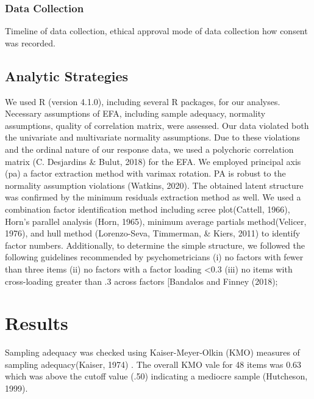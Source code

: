 \documentclass[
  english,
  man]{apa6}
\begin{document}
\hypertarget{data-collection}{%
\subsubsection{Data Collection}\label{data-collection}}

Timeline of data collection,
ethical approval
mode of data collection
how consent was recorded.

\hypertarget{analytic-strategies}{%
\subsection{Analytic Strategies}\label{analytic-strategies}}

We used R (version 4.1.0), including several R packages, for our analyses. Necessary assumptions of EFA, including sample adequacy, normality assumptions, quality of correlation matrix, were assessed. Our data violated both the univariate and multivariate normality assumptions. Due to these violations and the ordinal nature of our response data, we used a polychoric correlation matrix (C. Desjardins \& Bulut, 2018) for the EFA. We employed principal axis (pa) a factor extraction method with varimax rotation. PA is robust to the normality assumption violations (Watkins, 2020). The obtained latent structure was confirmed by the minimum residuals extraction method as well. We used a combination factor identification method including scree plot(Cattell, 1966), Horn's parallel analysis (Horn, 1965), minimum average partials method(Velicer, 1976), and hull method (Lorenzo-Seva, Timmerman, \& Kiers, 2011) to identify factor numbers. Additionally, to determine the simple structure, we followed the following guidelines recommended by psychometricians (i) no factors with fewer than three items (ii) no factors with a factor loading \textless0.3 (iii) no items with cross-loading greater than .3 across factors {[}Bandalos and Finney (2018);

\hypertarget{results}{%
\section{Results}\label{results}}

Sampling adequacy was checked using Kaiser-Meyer-Olkin (KMO) measures of sampling adequacy(Kaiser, 1974) . The overall KMO vale for 48 items was 0.63 which was above the cutoff value (.50) indicating a mediocre sample (Hutcheson, 1999).
\end{document}
